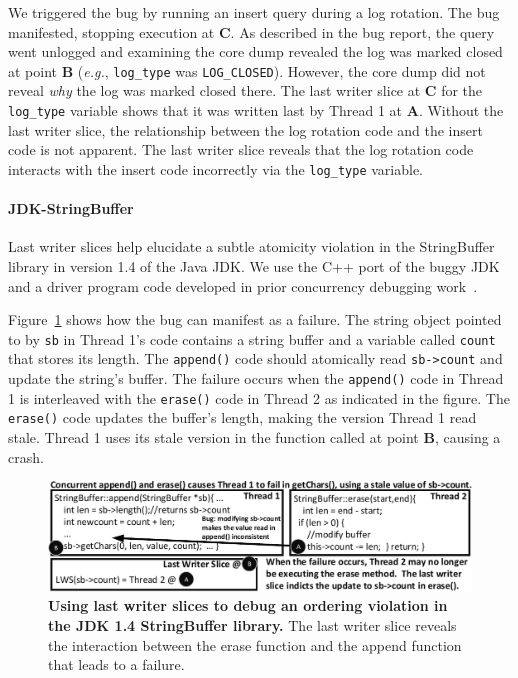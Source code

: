 \documentclass[preprint,9pt]{sigplanconf}
\begin{document}
We triggered the bug by running an insert query during a log rotation.  The bug
manifested, stopping execution at {\bf C}.  As described in the bug report, the
query went unlogged and examining the core dump revealed the log was marked
closed at point {\bf B} ({\em e.g.}, {\tt log\_type} was {\tt LOG\_CLOSED}).
However, the core dump did not reveal {\em why} the log was marked closed
there.  The last writer slice at {\bf C} for the {\tt log\_type} variable shows
that it was written last by Thread 1 at {\bf A}.  Without the last writer
slice, the relationship between the log rotation code and the insert code is
not apparent. The last writer slice reveals that the log rotation code
interacts with the insert code incorrectly via the {\tt log\_type} variable.  


\paragraph{JDK-StringBuffer}

Last writer slices help elucidate a subtle atomicity violation in the
StringBuffer library in version 1.4 of the Java JDK.  We use the C++ port of
the buggy JDK and a driver program code developed in prior concurrency debugging
work~\cite{concurrencybugs}.  


Figure~\ref{fig:jdklws} shows how the bug can manifest as a failure. The string
object pointed to by {\tt sb} in Thread 1's code contains a string buffer and a
variable called {\tt count} that stores its length.  The {\tt append()}
code should atomically read {\tt sb->count} and update the string's buffer.
The failure occurs when the {\tt append()} code in Thread 1 is interleaved with
the {\tt erase()} code in Thread 2 as indicated in the figure.  The {\tt
erase()} code updates the buffer's length, making the version Thread 1 read
stale.  Thread 1 uses its stale version in the function called at point {\bf
B}, causing a crash.  

\begin{figure}[h]
\centering
\includegraphics[width=\columnwidth]{figs/JDKStringBufferDebug.pdf}
\caption{\label{fig:jdklws}{\bf Using last writer slices to debug an
ordering violation in the JDK 1.4 StringBuffer library.} The last writer slice reveals the interaction between the erase function and the append function that leads to a failure.}
\end{figure}
\end{document}
